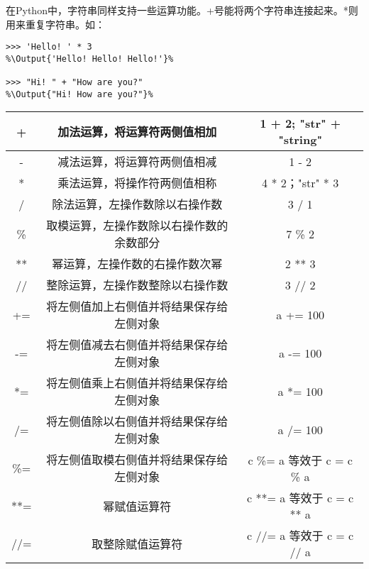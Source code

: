 \documentclass[../../Main.tex]{subfiles}
\begin{document}
在Python中，字符串同样支持一些运算功能。+号能将两个字符串连接起来。*则用来重复字符串。如：

\begin{lstlisting}
>>> 'Hello! ' * 3
%\Output{'Hello! Hello! Hello!'}%

>>> "Hi! " + "How are you?"
%\Output{"Hi! How are you?"}%

\end{lstlisting}

\begin{center}
    \tabletail{\hline}
    \tablelasttail{\hline}
    \label{table:3.1.2}
    \begin{supertabular}{|c|c|c|}
        \hline
        + & 加法运算，将运算符两侧值相加 & 1 + 2; "str" + "string" \\
        \hline
        - & 减法运算，将运算符两侧值相减 & 1 - 2\\
        \hline
        * & 乘法运算，将操作符两侧值相称 & 4 * 2；"str" * 3\\
        \hline
        / & 除法运算，左操作数除以右操作数 & 3 / 1\\
        \hline
        \% & 取模运算，左操作数除以右操作数的余数部分 & 7 \% 2\\
        \hline
        ** & 幂运算，左操作数的右操作数次幂 & 2 ** 3\\
        \hline
        // & 整除运算，左操作数整除以右操作数& 3 // 2\\
        \hline
        += & 将左侧值加上右侧值并将结果保存给左侧对象 & a += 100\\
        \hline
        -= & 将左侧值减去右侧值并将结果保存给左侧对象 & a -= 100\\
        \hline
        *= & 将左侧值乘上右侧值并将结果保存给左侧对象 & a *= 100\\
        \hline
        /= & 将左侧值除以右侧值并将结果保存给左侧对象 & a /= 100\\
        \hline
        \%= & 将左侧值取模右侧值并将结果保存给左侧对象 & c \%= a 等效于 c = c \% a\\
        \hline
        **=	& 幂赋值运算符 & c **= a 等效于 c = c ** a\\
        \hline
        //=	& 取整除赋值运算符 & c //= a 等效于 c = c // a\\
        \hline
    \end{supertabular}
\end{center}
\end{document}
